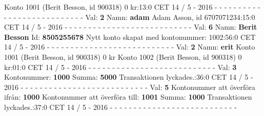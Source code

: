 \begin{multicols}{2}
Konto 1001 (Berit Besson, id 900318) 0 kr:13:0 CET 14 / 5 - 2016\newline
- - - - - - - - - - - - - - - - - - - - - - - - - - -\newline
Val: \textbf{2}\newline
Namn: \textbf{adam}\newline
Adam Asson, id 6707071234:15:0 CET 14 / 5 - 2016\newline
- - - - - - - - - - - - - - - - - - - - - - - - - - -\newline
Val: \textbf{6}\newline
Namn: \textbf{Berit Besson}\newline
Id: \textbf{8505255678}\newline
Nytt konto skapat med kontonummer: 1002:56:0 CET 14 / 5 - 2016\newline
- - - - - - - - - - - - - - - - - - - - - - - - - - -\newline
Val: \textbf{2}\newline
Namn: \textbf{erit}\newline
Konto 1001 (Berit Besson, id 900318) 0 kr\newline
Konto 1002 (Berit Besson, id 900318) 0 kr:01:0 CET 14 / 5 - 2016\newline
- - - - - - - - - - - - - - - - - - - - - - - - - - -\newline
Val: \textbf{3}\newline
Kontonummer: \textbf{1000}\newline
Summa: \textbf{5000}\newline
Transaktionen lyckades.:36:0 CET 14 / 5 - 2016\newline
- - - - - - - - - - - - - - - - - - - - - - - - - - -\newline
Val: \textbf{5}\newline
Kontonummer att överföra ifrån: \textbf{1000}\newline
Kontonummer att överföra till: \textbf{1001}\newline
Summa: \textbf{1000}\newline
Transaktionen lyckades.:37:0 CET 14 / 5 - 2016\newline
- - - - - - - - - - - - - - - - - - - - - - - - - - -\newline

\end{multicols}
